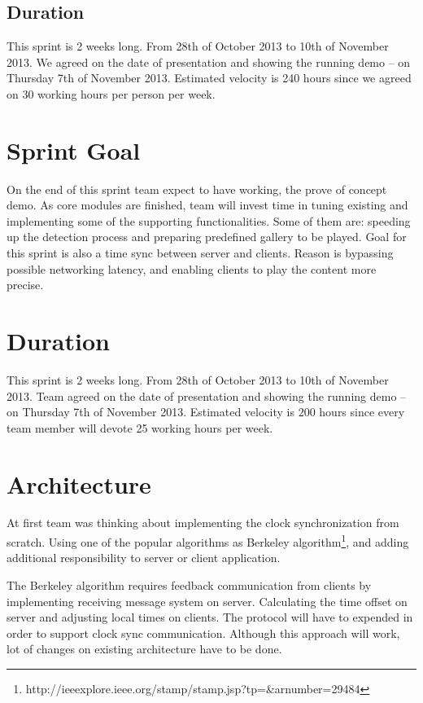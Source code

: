 

\subsection{Duration}
This sprint is 2 weeks long. From 28th of October 2013 to 10th of November 2013. We agreed
on the date of presentation and showing the running demo – on Thursday 7th of November 2013.
Estimated velocity is 240 hours since we agreed on 30 working hours per person per week. 


\section{Sprint Goal}

On the end of this sprint team expect to have working, the prove of concept demo. As core modules are finished, team will invest time in tuning existing and implementing some of the supporting functionalities. Some of them are: speeding up the detection process  and preparing predefined gallery to be played. Goal for this sprint is also a time sync between server and clients. Reason is bypassing possible networking latency, and enabling clients to play the content more precise. 

\section{Duration}
This sprint is 2 weeks long. From 28th of October 2013 to 10th of November 2013. 
Team agreed on the date of presentation and showing the running demo – on Thursday 7th of November 2013.
Estimated velocity is 200 hours since every team member will devote 25 working hours per week.

\section{Architecture}

At first team was thinking about implementing the clock synchronization from scratch. Using one of the popular algorithms as Berkeley algorithm\footnote{http://ieeexplore.ieee.org/stamp/stamp.jsp?tp=\&arnumber=29484}, and adding additional responsibility to server or client application. 

The Berkeley algorithm requires feedback communication from clients by implementing receiving message system on server. Calculating the time offset on server and adjusting local times on clients. The protocol will have to expended in order to support clock sync communication. Although this approach will work, lot of changes on existing architecture have to be done.

